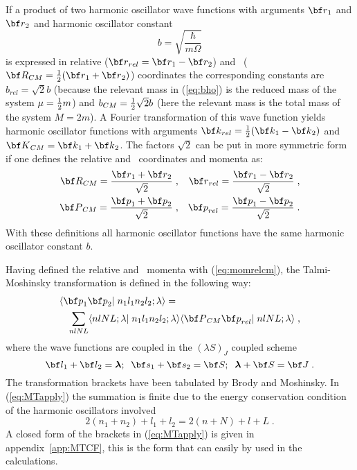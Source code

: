 If a product of two harmonic oscillator wave functions with arguments
$\rvec{r}_1$ and $\rvec{r}_2$ and harmonic oscillator constant
%
	\begin{equation}
		b
	=
		\sqrt{\frac{\hbar}
		           {m\Omega}
		}
	\label{eq:bho}
	\end{equation}
%
is expressed in
relative ($\rvec{r}_{rel}=\rvec{r}_1-\rvec{r}_2$) and \CM\ 
($\rvec{R}_{\CM}=\half(\rvec{r}_1+\rvec{r}_2)$) coordinates the corresponding 
constants are
 $b_{rel}=\sqrt{2}b$ (because the relevant mass in (\ref{eq:bho}) is 
the reduced mass of the system $\mu={\mbox{$\frac{1}{2}$}} m$) 
and $b_{CM}={\mbox{$\frac{1}{2}$}}\sqrt{2}b$ (here the relevant mass is
the total mass of the system $M=2m$).
A Fourier transformation of this wave function yields harmonic oscillator
functions with arguments
$\rvec{k}_{rel}=\half(\rvec{k}_1-\rvec{k}_2)$ and 
$\rvec{K}_{\CM}=\rvec{k}_1+\rvec{k}_2$.
The factors $\sqrt{2}$ can be put in more symmetric form if one defines the
relative and \CM\ coordinates and momenta as:
%
	\begin{eqnarray} 
		\rvec{R}_{\CM}  = \frac{\rvec{r}_1+\rvec{r}_2}{\sqrt{2}} \;,& &
		\rvec{r}_{rel} = \frac{\rvec{r}_1-\rvec{r}_2}{\sqrt{2}} \;,\\
		\rvec{P}_{\CM}  = \frac{\rvec{p}_1+\rvec{p}_2}{\sqrt{2}} \;,& &
		\rvec{p}_{rel} = \frac{\rvec{p}_1-\rvec{p}_2}{\sqrt{2}} \;.
	\label{eq:momrelcm}
	\end{eqnarray} 
%
With these definitions all harmonic oscillator functions have the same 
harmonic oscillator constant $b$.

Having defined the relative and \CM\ momenta with (\ref{eq:momrelcm}),
the Talmi-Moshinsky transformation is defined in the following way:
%
	\begin{eqnarray}
	\lefteqn{
		\inp< \rvec{p}_1 \rvec{p}_2 | n_1 l_1 n_2 l_2; \lambda>
	=}
	&&
	\label{eq:MTapply} \\
	&&
		\sum_{nlNL}
		\inp< n l N L; \lambda| n_1 l_1 n_2 l_2; \lambda>
		\inp< \rvec{P}_{\CM} \rvec{p}_{rel}| n l N L; \lambda >
	\nonumber
	\;,
	\end{eqnarray}
%
where the wave functions are coupled in the $(\lambda S)_J$ coupled scheme
%
	\begin{equation} 
		\rvec{l}_1 + \rvec{l}_2 = \gvec{\lambda} ;\;\; 
		\rvec{s}_1 + \rvec{s}_2 = \rvec{S} ;\;\; 
		\gvec{\lambda} + \rvec{S} = \rvec{J} 
	\label{eq:lambdaSJ}
	\;.
	\end{equation} 
%
The transformation brackets have been tabulated by Brody and 
Moshinsky\cite{MB60}. 
In (\ref{eq:MTapply}) the summation is finite due to the energy 
conservation condition of the harmonic oscillators involved
%
	\begin{equation}
		2(n_1+n_2) + l_1+l_2
	=
		2(n+N)+l+L
	\label{eq:MTEC}
	\;.
	\end{equation}
%
A closed form of the brackets in (\ref{eq:MTapply}) is given
in appendix~\ref{app:MTCF}, this is the form that can easily by used in the 
calculations.
	
